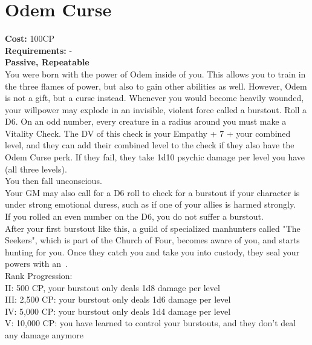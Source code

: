 \section{Odem Curse}\label{perk:odemCurse}
\textbf{Cost:} 100CP\\
\textbf{Requirements:} -\\
\textbf{Passive, Repeatable}\\
You were born with the power of Odem inside of you.
This allows you to train in the three flames of power, but also to gain other abilities as well.
However, Odem is not a gift, but a curse instead.
Whenever you would become heavily wounded, your willpower may explode in an invisible, violent force called a burstout.
Roll a D6. On an odd number, every creature in a  radius around you must make a Vitality Check.
The DV of this check is your Empathy + 7 + your combined level, and they can add their combined level to the check if they also have the Odem Curse perk.
If they fail, they take 1d10 psychic damage per level you have (all three levels).\\
You then fall unconscious.\\
Your GM may also call for a D6 roll to check for a burstout if your character is under strong emotional duress, such as if one of your allies is harmed strongly.\\
If you rolled an even number on the D6, you do not suffer a burstout.\\
After your first burstout like this, a guild of specialized manhunters called "The Seekers", which is part of the Church of Four, becomes aware of you, and starts hunting for you.
Once they catch you and take you into custody, they seal your powers with an~.
\\
Rank Progression:\\
II: 500 CP, your burstout only deals 1d8 damage per level\\
III: 2,500 CP: your burstout only deals 1d6 damage per level\\
IV: 5,000 CP: your burstout only deals 1d4 damage per level\\
V: 10,000 CP: you have learned to control your burstouts, and they don't deal any damage anymore\\
